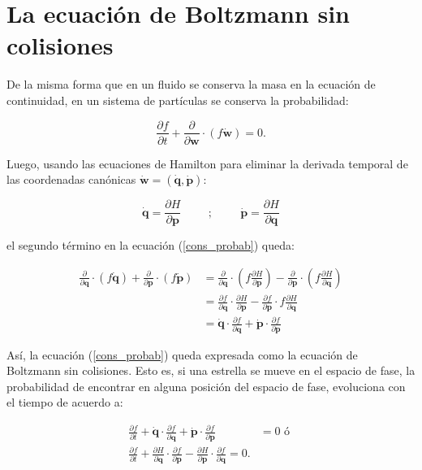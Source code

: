 \section{La ecuación de Boltzmann sin colisiones}


De la misma forma que en un fluido se conserva la masa en la ecuación de continuidad, en un sistema de partículas se conserva la probabilidad:

\begin{equation}
\label{cons_probab}
\frac{\partial f}{\partial t} + \frac{\partial }{\partial \textbf{w}} \cdot (f \dot{\textbf{w}} ) = 0.
\end{equation}

Luego, usando las ecuaciones de Hamilton para eliminar la derivada temporal de las coordenadas canónicas $ \dot{\textbf{w}} = (\dot{\textbf{q}}, \dot{\textbf{p}})$:

$$ \dot{\textbf{q}} = \frac{\partial H}{\partial \textbf{p}} \hspace{1cm} ; \hspace{1cm}  \dot{\textbf{p}} = \frac{\partial H}{\partial \textbf{q}}    $$

el segundo término en la ecuación (\ref{cons_probab}) queda:

\begin{align*}
\frac{\partial }{\partial \textbf{q}} \cdot (f\dot{\textbf{q}}) + \frac{\partial }{\partial \textbf{p}} \cdot (f\dot{\textbf{p}}) &=  \frac{\partial }{\partial \textbf{q}} \cdot \left (f \frac{\partial H}{\partial \textbf{p}} \right ) -  \frac{\partial }{\partial \textbf{p}} \cdot \left (f \frac{\partial H}{\partial \textbf{q}} \right ) \\
&=  \frac{\partial f }{\partial \textbf{q}} \cdot \frac{\partial H}{\partial \textbf{p}}  -  \frac{\partial f }{\partial \textbf{p}} \cdot f \frac{\partial H}{\partial \textbf{q}} \\
&= \dot{\textbf{q}} \cdot \frac{\partial f }{\partial \textbf{q}} + \dot{\textbf{p}} \cdot \frac{\partial f }{\partial \textbf{p}}
\end{align*} 

Así, la ecuación (\ref{cons_probab}) queda expresada como la ecuación de Boltzmann sin colisiones. Esto es, si una estrella se mueve en el espacio de fase, la probabilidad de encontrar en alguna posición del espacio de fase, evoluciona con el tiempo de acuerdo a:

\begin{align}
\label{Boltzmann_eq}
\frac{\partial f}{\partial t} + \dot{\textbf{q}} \cdot \frac{\partial f }{\partial \textbf{q}} + \dot{\textbf{p}} \cdot \frac{\partial f }{\partial \textbf{p}} &= 0 \textrm{ ó }\\
\label{Boltzmann_eq_gener}
\frac{\partial f}{\partial t} + \frac{\partial H}{\partial \textbf{q}} \cdot \frac{\partial f }{\partial \textbf{p}} - \frac{\partial H}{\partial \textbf{p}} \cdot \frac{\partial f }{\partial \textbf{q}} = 0.
\end{align}

